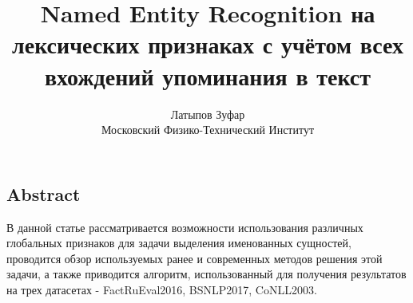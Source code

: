 \documentclass[letterpaper,twocolumn,10pt]{article}
\begin{document}
\date{}

\title{\Large \textbf{Named Entity Recognition на лексических признаках с учётом всех вхождений упоминания в текст} }

\author{
{\rm Латыпов Зуфар}\\
Московский Физико-Технический Институт
}

\maketitle

\thispagestyle{empty}

\subsection*{Abstract}
В данной статье рассматривается возможности использования различных глобальных признаков для задачи выделения именованных сущностей, проводится обзор используемых ранее и современных методов решения этой задачи, а также приводится алгоритм, использованный для получения результатов на трех датасетах - FactRuEval2016, BSNLP2017, CoNLL2003.











{\footnotesize 


}
\end{document}

